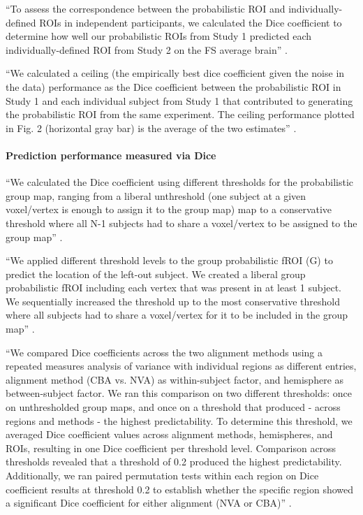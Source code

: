 ``To assess the correspondence between the probabilistic ROI and
individually-defined ROIs in independent participants, we calculated the Dice
coefficient to determine how well our probabilistic ROIs from Study 1 predicted
each individually-defined ROI from Study 2 on the FS average brain''
\citep{weiner2018defining}.

``We calculated a ceiling (the empirically best dice coefficient given the noise
in the data) performance as the Dice coefficient between the probabilistic ROI
in Study 1 and each individual subject from Study 1 that contributed to
generating the probabilistic ROI from the same experiment.
%
The ceiling performance plotted in Fig. 2 (horizontal gray bar) is the average
of the two estimates'' \citep{weiner2018defining}.





\paragraph{Prediction performance measured via Dice}



``We calculated the Dice coefficient using different thresholds for the
probabilistic group map, ranging from a liberal unthreshold (one subject at a
given voxel/vertex is enough to assign it to the group map) map to a
conservative threshold where all N-1 subjects had to share a voxel/vertex to be
assigned to the group map'' \citet{rosenke2021probabilistic}.

``We applied different threshold levels to the group probabilistic fROI (G) to
predict the location of the left-out subject.
%
We created a liberal group probabilistic fROI including each vertex
that was present in at least 1 subject.
%
We sequentially increased the threshold up to the most conservative
threshold where all subjects had to share a voxel/vertex for it to be included
in the group map'' \citet{rosenke2021probabilistic}.

``We compared Dice coefficients across the two alignment methods using a
repeated measures analysis of variance with individual regions as different
entries, alignment method (CBA vs. NVA) as within-subject factor, and hemisphere
as between-subject factor.
%
We ran this comparison on two different thresholds:
%
once on unthresholded group maps, and once on a threshold that produced - across
regions and methods - the highest predictability.
%
To determine this threshold, we averaged Dice coefficient values across
alignment methods, hemispheres, and ROIs, resulting in one Dice coefficient per
threshold level.
%
Comparison across thresholds revealed that a threshold of 0.2 produced the
highest predictability.
%
Additionally, we ran paired permutation tests within each region on Dice
coefficient results at threshold 0.2 to establish whether the specific region
showed a significant Dice coefficient for either alignment (NVA or CBA)''
\citep{rosenke2021probabilistic}.



